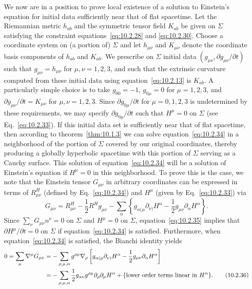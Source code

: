 We now are in a position to prove local existence of a solution to Einstein's equation
for initial data sufficiently near that of flat spacetime. Let the Riemannian metric
\(h_{ab}\) and the symmetric tensor field \(K_{ab}\) be given on \(\Sigma\) satisfying
the constraint equations~\eqref{eq:10.2.28} and \eqref{eq:10.2.30}. Choose a
coordinate system on (a portion of) \(\Sigma\) and let \(h_{\mu\nu}\) and
\(K_{\mu\nu}\) denote the coordinate basis components of \(h_{ab}\) and \(K_{ab}\).
We prescribe on \(\Sigma\) initial data \((g_{\mu\nu},\partial g_{\mu\nu}/\partial t)\)
such that \(g_{\mu\nu}=h_{\mu\nu}\) for \(\mu,\nu=1,2,3\), and such that the extrinsic
curvature computed from these initial data using equation~\eqref{eq:10.2.13} is
\(K_{ab}\). A particularly simple choice is to take \(g_{00}=-1\), \(g_{0\mu}=0\) for
\(\mu=1,2,3\), and \(\partial g_{\mu\nu}/\partial t=K_{\mu\nu}\) for
\(\mu,\nu=1,2,3\). Since \(\partial g_{0\mu}/\partial t\) for \(\mu=0,1,2,3\) is
undetermined by these requirements, we may specify \(\partial g_{0\mu}/\partial t\)
such that \(H^\mu=0\) on \(\Sigma\) (see Eq.~\eqref{eq:10.2.33}). If this initial
data set is sufficiently near that of flat spacetime, then according to
theorem~\ref{thm:10.1.3} we can solve equation~\eqref{eq:10.2.34} in a neighborhood
of the portion of \(\Sigma\) covered by our original coordinates, thereby producing a
globally hyperbolic spacetime with this portion of \(\Sigma\) serving as a Cauchy
surface. This solution of equation~\eqref{eq:10.2.34} will be a solution of Einstein's
equation if \(H^\mu=0\) in this neighborhood. To prove this is the case, we note that
the Einstein tensor \(G_{\mu\nu}\) in arbitrary coordinates can be expressed in terms
of \(R^H_{\mu\nu}\) (defined by Eq.~\eqref{eq:10.2.34}) and \(H^\mu\) (given by
Eq.~\eqref{eq:10.2.33}) via
\begin{equation}
  G_{\mu\nu}=R^H_{\mu\nu}-\frac12R^Hg_{\mu\nu}
  -\sum_\alpha\left\{g_{\alpha(\mu}\partial_{\nu)}H^\alpha
    -\frac12g_{\mu\nu}\partial_\alpha H^\alpha\right\}.
  \tag{10.2.35}\label{eq:10.2.35}
\end{equation}
Since \(\sum_\nu G_{\mu\nu}n^\nu=0\) on \(\Sigma\) and \(H^\mu=0\) on
\(\Sigma\), equation~\eqref{eq:10.2.35} implies that
\(\partial H^\mu/\partial t=0\) on \(\Sigma\) if equation~\eqref{eq:10.2.34} is
satisfied. Furthermore, when equation~\eqref{eq:10.2.34} is satisfied, the Bianchi
identity yields
\begin{align}
  0=\sum_\mu\nabla^\mu G_{\mu\nu}
  &=-\sum_{\rho,\mu,\alpha}g^{\rho\mu}\nabla_\rho
    \left[g_{\alpha(\mu}\partial_{\nu)}H^\alpha
      -\frac12g_{\mu\nu}\partial_\alpha H^\alpha\right] \notag\\
  &=-\sum_{\rho,\mu,\alpha}\frac12g_{\alpha\nu}g^{\rho\mu}
    \partial_\rho\partial_\mu H^\alpha
    +\{\text{lower order terms linear in }H^\alpha\}.
  \tag{10.2.36}\label{eq:10.2.36}
\end{align}
